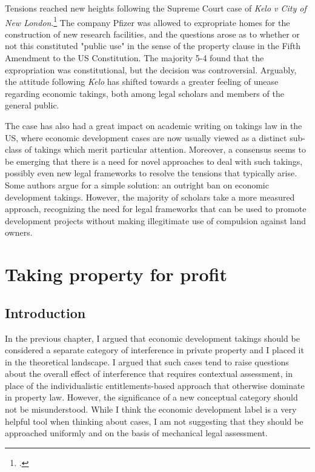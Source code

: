 Tensions reached new heights following the Supreme Court case of {\it Kelo v City of New London}.\footcite{kelo05}  The company Pfizer was allowed to expropriate homes for the construction of new research facilities, and the questions arose as to whether or not this constituted "public use" in the sense of the property clause in the Fifth Amendment to the US Constitution.  The majority 5-4 found that the expropriation was constitutional, but the decision was controversial. Arguably, the attitude following {\it Kelo} has shifted towards a greater feeling of unease regarding economic takings, both among legal scholars and members of the general public.

The case has also had a great impact on academic writing on takings law in the US, where economic development cases are now usually viewed as a distinct sub-class of takings which merit particular attention. Moreover, a consensus seems to be emerging that there is a need for novel approaches to deal with such takings, possibly even new legal frameworks to resolve the tensions that typically arise. Some authors argue for a simple solution: an outright ban on economic development takings. However, the majority of scholars take a more measured approach, recognizing the need for legal frameworks that can be used to promote development projects without making illegitimate use of compulsion against land owners.


\chapter{Taking property for profit}\label{chap:2}

\section{Introduction}

In the previous chapter, I argued that economic development takings should be considered a separate category of interference in private property and I placed it in the theoretical landscape. I argued that such cases tend to raise questions about the overall effect of interference that requires contextual assessment, in place of the individualistic entitlements-based approach that otherwise dominate in property law. However, the significance of a new conceptual category should not be misunderstood. While I think the economic development label is a very helpful tool when thinking about cases, I am not suggesting that they should be approached uniformly and on the basis of mechanical legal assessment. 


